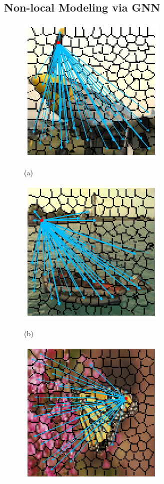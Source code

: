 \subsection{Non-local Modeling via GNN}
\begin{figure}[!ht]
	\centering
	\begin{minipage}[t]{.49\linewidth}
		\includegraphics[width=2.8in]{images/jet_superpixel.jpg}
		\centerline{(a)}
		\label{JET}
	\end{minipage}
	\begin{minipage}[t]{.49\linewidth}
		\includegraphics[width=2.8in]{images/I06_superpixel.jpg}
		\centerline{(b)}
		\label{BOAT}
	\end{minipage}
	\begin{minipage}[t]{.49\linewidth}
		\includegraphics[width=2.8in]{images/monarch_superpixel.jpg}

\end{minipage}
\end{figure}

